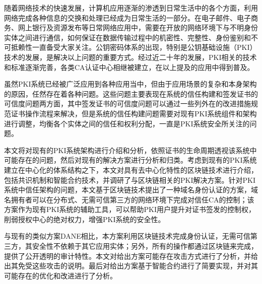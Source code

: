 
\begin{cabstract}




随着网络技术的快速发展，计算机应用逐渐的渗透到日常生活中的各个方面，利用网络完成各种信息的交换和处理已经成为日常生活的一部分。在电子邮件、电子商务、网上银行及资源发布等日常网络应用中，需要在开放的网络环境下与不明身份实体之间进行通信，如何保证在数据传输过程中的机密性、完整性、身份鉴别和不可抵赖性一直备受大家关注。公钥密码体系的出现，特别是公钥基础设施（PKI）技术的发展，是解决以上问题的重要方式。经过近二十年的发展，PKI相关的技术和标准逐渐完善，各类CA认证中心相继被建立，在以上提及的应用中得到普及。


虽然PKI系统已经被广泛应用到各种应用当中，但由于应用场景的复杂和本身架构的原因，任然存在着各种问题。这些问题主要表现在系统的信任构建和签发证书的可信度问题两方面，其中签发证书的可信度问题可以通过一些列外在的改进措施规范证书操作流程来解决，但是系统的信任构建问题需要对现有PKI系统组件和架构进行调整，均衡各个实体之间的信任和权利分配，一直是PKI系统安全所关注的问题。


本文将对现有的PKI系统架构进行介绍和分析，依照证书的生命周期透视该系统中可能存在的问题，然后对现有的解决方案进行分析和归类。考虑到现有的PKI系统建立在中心化的体系结构之下，本文对具有去中心化特性的区块链技术进行介绍，包括共识机制和智能合约技术，并调研了与区块链相关的PKI解决方案。针对PKI系统中信任架构的问题，本文基于区块链技术提出了一种域名身份认证的方案，域名拥有者可以在分布式、无需可信第三方的网络环境下完成对信任CA的控制；该方案作为现有PKI系统的辅助工具，可以帮助PKI用户提升对证书签发的控制权，削弱授权中心的绝对权力，增强PKI系统的安全性。

与现有的类似方案DANE相比，本方案利用区块链技术完成身份认证，无需可信第三方，其安全性不依赖于其它应用实体；另外，所有的操作都通过区块链来完成，提供了公开透明的审计特性。本文对给出方案可能存在攻击方式进行了分析，并给出其免受这些攻击的说明。最后对给出方案基于智能合约进行了简要实现，并对其可能存在的优化和改进进行了分析。


\end{cabstract}

